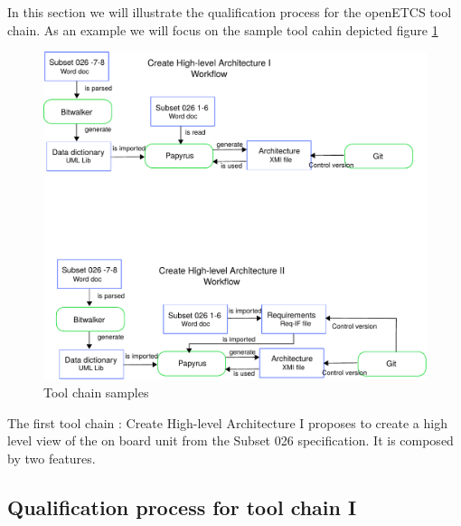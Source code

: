 In this section we will illustrate the qualification process for the
openETCS tool chain.
As an example we will focus on the sample tool cahin depicted figure
\ref{fig:sample}

\begin{figure}[h]
\includegraphics[width=\textwidth]{toolchainsample}
\caption{\label{fig:sample} Tool chain samples} 
\end{figure}

The first tool chain : Create High-level Architecture I proposes to
create a high level view of the on board unit from the Subset 026
specification. It  is composed by
two features.  
\subsection{Qualification process for tool chain I}
